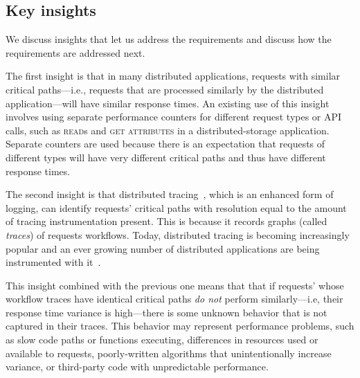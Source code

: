 \subsection{Key insights}
\label{sec:motivaton:insights}

We discuss insights that let us address the requirements and
discuss how the requirements are addressed next.

The first insight is that in many distributed applications, requests
with similar critical paths---i.e., requests that are processed
similarly by the distributed application---will have similar response
times.  An existing use of this insight involves using separate
performance counters for different request types or API calls, such as
\textsc{read}s and \textsc{get attributes} in a distributed-storage
application.  Separate counters are used because there is an
expectation that requests of different types will have very different
critical paths and thus have different response times.

The second insight is that distributed
tracing~\cite{Sambasivan:2016bo, Parker, Shkuro}, which is an enhanced
form of logging, can identify requests' critical paths with resolution
equal to the amount of tracing instrumentation present.  This is
because it records graphs (called \textit{traces}) of requests
workflows.  Today, distributed tracing is becoming increasingly
popular and an ever growing number of distributed applications are
being instrumented with it~\cite{HDFS, CockroachDB, Weil:2006ti,
  Openstack, Kaldor:2017gp, Sigelman:2010uj, Mace2017survey}.

This insight combined with the previous one means that that if
requests' whose workflow traces have identical critical paths
\textit{do not} perform similarly---i.e, their response time variance
is high---there is some unknown behavior that is not captured in their
traces.  This behavior may represent performance problems, such as
slow code paths or functions executing, differences in resources used
or available to requests, poorly-written algorithms that
unintentionally increase variance, or third-party code with
unpredictable performance.



